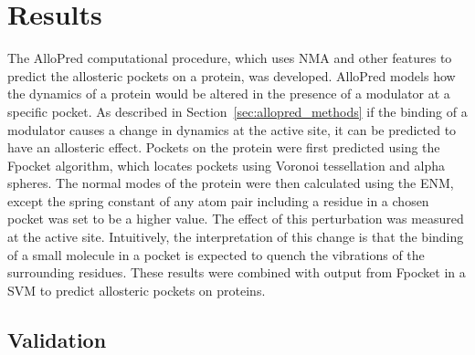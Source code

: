 \section{Results}
\label{sec:allopred_results}

The AlloPred computational procedure, which uses NMA and other features to predict the allosteric pockets on a protein, was developed.
AlloPred models how the dynamics of a protein would be altered in the presence of a modulator at a specific pocket.
As described in Section~\ref{sec:allopred_methods} if the binding of a modulator causes a change in dynamics at the active site, it can be predicted to have an allosteric effect.
Pockets on the protein were first predicted using the Fpocket \cite{LeGuilloux2009} algorithm, which locates pockets using Voronoi tessellation and alpha spheres.
The normal modes of the protein were then calculated using the ENM, except the spring constant of any atom pair including a residue in a chosen pocket was set to be a higher value.
The effect of this perturbation was measured at the active site.
Intuitively, the interpretation of this change is that the binding of a small molecule in a pocket is expected to quench the vibrations of the surrounding residues.
These results were combined with output from Fpocket in a SVM to predict allosteric pockets on proteins.


\subsection{Validation}

